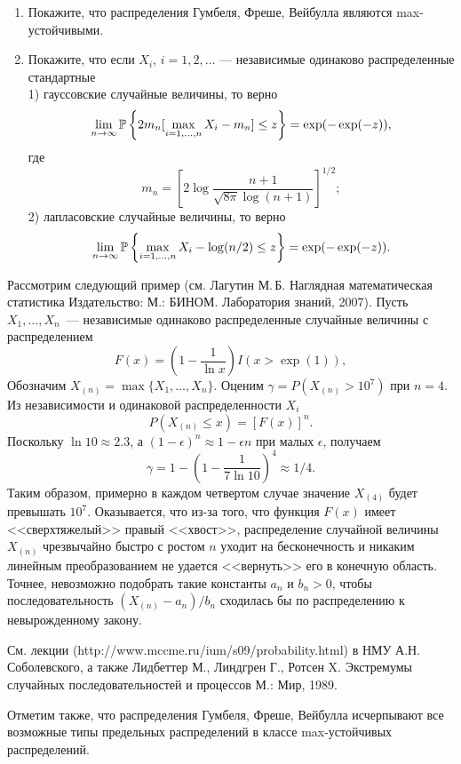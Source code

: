 \begin{problem}
\begin{enumerate}
\item Покажите, что распределения Гумбеля, Фреше, Вейбулла являются max-устойчивыми.

\item Покажите, что если $X_i$, $i=1,2,\dots$ --- независимые одинаково распределенные стандартные
\\
1)  гауссовские случайные величины, то верно
\[
\lim_{n\to\infty}\mathrm{{\mathbb P}}\left\{2m_n[\max_{i=1,\dots,n}{X_i} - m_n]\leq z \right\}= \exp(-\exp(-z)),
\]
\noindent
где 
\[
  m_n = \left[2\log\frac{n+1}{\sqrt{8\pi}\log(n+1)}\right]^{1/2};
\]
2) лапласовские случайные величины, то верно
\[
\lim_{n\to\infty}\mathrm{{\mathbb P}}\left\{\max_{i=1,\dots,n}{X_i} - \log(n/2)\leq z \right\}= \exp(-\exp(-z)).
\]
\end{enumerate}

\begin{remark}
Рассмотрим следующий пример (см. Лагутин М.\,Б. Наглядная математическая статистика Издательство: М.: БИНОМ. Лаборатория знаний, 2007). Пусть $X_1,\dots,X_n$~--- независимые одинаково распределенные случайные величины с распределением 
$$
F(x) = \left(1-\frac{1}{\ln x}\right)I\left(x>\exp(1)\right),  
$$
Обозначим $X_{(n)} = \max\{X_1,\dots,X_n\}$. Оценим $\gamma = P(X_{(n)}>10^7)$ при $n=4$. Из независимости и одинаковой распределенности $X_i$ 
$$P(X_{(n)}\leq x) = [F(x)]^n.$$
Поскольку $\ln 10 \approx 2.3$, а $(1-\epsilon)^n\approx 1-\epsilon n$ при малых $\epsilon$, получаем
$$\gamma = 1 - \left(1-\frac{1}{7\ln 10}\right)^4 \approx 1/4.$$
Таким образом, примерно в каждом четвертом случае значение $X_{(4)}$ будет превышать $10^7$. 
Оказывается, что из-за того, что функция $F(x)$ имеет <<сверхтяжелый>> правый <<хвост>>, распределение случайной величины $X_{(n)}$ чрезвычайно быстро с ростом $n$ уходит на бесконечность и никаким линейным преобразованием не удается <<вернуть>> его в конечную область. Точнее, невозможно подобрать такие константы $a_n$ и $b_n>0$, чтобы последовательность $(X_{(n)}-a_{n})/b_n$ сходилась бы по распределению к невырожденному закону.

См. лекции (http://www.mccme.ru/ium/s09/probability.html) в НМУ  А.Н. Соболевского, а также Лидбеттер М., Линдгрен Г., Ротсен X. Экстремумы случайных последовательностей и процессов М.: Мир, 1989.

Отметим также, что распределения Гумбеля, Фреше, Вейбулла исчерпывают все возможные типы предельных распределений в классе max-устойчивых распределений.
\end{remark}
\end{problem}



